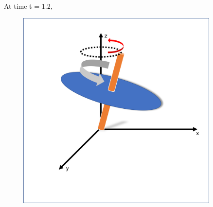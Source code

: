 \documentclass[10pt]{beamer}
\begin{document}
\begin{frame}



At time t = 1.2,

\begin{figure}[h]
	\begin{minipage}{0.6\textwidth}
		\centering
		\includegraphics[width=0.9\textwidth]{sphere1.png}
	\end{minipage}


\end{figure}
\end{frame}
\end{document}

